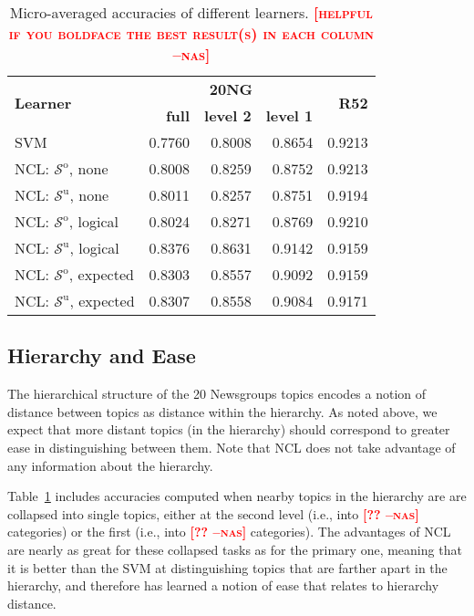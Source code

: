 \documentclass{article} %
\newcommand{\unorderedS}{\mathcal{S}^{\mathrm{u}}}
\newcommand{\orderedS}{\mathcal{S}^{\mathrm{o}}}
\newcommand{\ourmethod}{NCL}
\newcommand{\nascomment}[1]{\textcolor{red}{\textsc{\textbf{[#1 --nas]}}}}
\begin{document}
\begin{table}[t]
\caption{Micro-averaged accuracies of different
  learners. \nascomment{helpful if you boldface the best result(s) in
    each column}}
\label{accuraciesTable}
\begin{center}
\begin{tabular}{l|rrr|r}
\multirow{2}{*}{\bf Learner} &  \multicolumn{3}{c|}{\bf 20NG} & \multirow{2}{*}{\bf{R52}} \\
& \bf{full} & \bf{level 2}   & \bf{ level 1}   & 
\\ \hline 
SVM         & 0.7760      & 0.8008                & 0.8654                & 0.9213 \\
\ourmethod{}: $\orderedS$, none    & 0.8008      & 0.8259                & 0.8752                & 0.9213 \\ 
\ourmethod{}:            $\unorderedS$, none  & 0.8011      & 0.8257                & 0.8751                & 0.9194 \\
\ourmethod{}: $\orderedS$, logical    & 0.8024      & 0.8271                & 0.8769                & 0.9210 \\ 
\ourmethod{}: $\unorderedS$, logical  & 0.8376      & 0.8631                & 0.9142                & 0.9159 \\
\ourmethod{}:  $\orderedS$, expected    & 0.8303      & 0.8557                & 0.9092                & 0.9159 \\ 
\ourmethod{}: $\unorderedS$, expected       & 0.8307      & 0.8558                & 0.9084                & 0.9171 \\
\end{tabular}
\end{center}
\end{table}

\subsection{Hierarchy and Ease}


The hierarchical structure of the 20 Newsgroups topics encodes a notion
of distance between topics as distance within the hierarchy.  
As
noted above, we expect that more distant topics (in the hierarchy)
should correspond to greater ease in distinguishing between them.
Note that \ourmethod{} does not take advantage of any information
about the hierarchy.

Table~\ref{accuraciesTable} includes accuracies 
computed when nearby topics in the hierarchy are are collapsed into
single topics, either at the second level (i.e., into \nascomment{??}
categories) or the first (i.e., into \nascomment{??} categories).
The advantages of \ourmethod{} are nearly as great for these collapsed
tasks as for the primary one, meaning that it is better than the SVM
at distinguishing topics that are farther apart in the hierarchy, and
therefore has learned a notion of ease that relates to hierarchy
distance.
\end{document}
